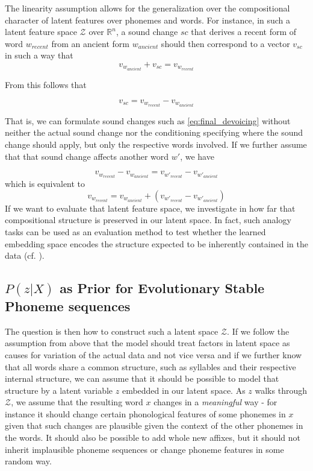\documentclass[6pt]{article}
\begin{document}
The linearity assumption allows for the generalization over the compositional character of latent features over phonemes and words. For instance, in such a latent feature space $\mathcal{Z}$ over $\mathbb{R}^n$, a sound change $sc$ that derives a recent form of word $w_{recent}$ from an ancient form  $w_{ancient}$ should then correspond to a vector $v_{sc}$ in such a way that 
\begin{equation}
\label{eq:sound_change_linear_dependency}
v_{w_{ancient}}+v_{sc} = v_{w_{recent}}
\end{equation}

From this follows that 

\begin{equation}
v_{sc} =  v_{w_{recent}} - v_{w_{ancient}} 
\end{equation}

That is, we can formulate sound changes such as \ref{eq:final_devoicing} without neither the actual sound change nor the conditioning specifying where the sound change should apply, but only the respective words involved.
If we further assume that that sound change affects another word $w'$, we have

\begin{equation}
v_{w_{recent}} - v_{w_{ancient}}  =  v_{w'_{recent}} - v_{w'_{ancient}} 
\end{equation}
which is equivalent to
\begin{equation}
v_{w_{recent}}  =   v_{w_{ancient}}  + (v_{w'_{recent}} - v_{w'_{ancient}}) 
\end{equation}
If we want to evaluate that latent feature space, we investigate in how far that compositional structure is preserved in our latent space. In fact, such analogy tasks can be used as an evaluation method to test whether the learned embedding space encodes the structure expected to be inherently contained in the data (cf. \cite{mikolov2013distributed}).

\subsection{$P(z|X)$ as Prior for Evolutionary Stable Phoneme sequences}

The question is then how to construct such a latent space $\mathcal{Z}$. If we follow the assumption from above that the model should treat factors in latent space as causes for variation of the actual data and not vice versa and if we further know that all words share a common structure, such as syllables and their respective internal structure, we can assume that it should be possible to model that structure by a latent variable $z$ embedded in our latent space. As $z$ walks through $\mathcal{Z}$, we assume that the resulting word $x$ changes in a \textit{meaningful} way - for instance it should change certain phonological features of some phonemes in $x$ given that such changes are plausible given the context of the other phonemes in the words. It should also be possible to add whole new affixes, but it should not inherit implausible phoneme sequences or change phoneme features in some random way. 
\end{document}
